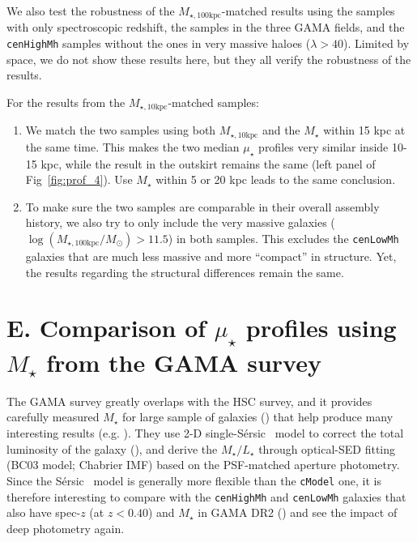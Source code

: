 \documentclass[a4paper,fleqn,usenatbib]{mnras}
\def\ser{{S\'{e}rsic\ }}
\def\rbcg{\texttt{cenHighMh}}
\def\nbcg{\texttt{cenLowMh}}
\def\mstar{{$M_{\star}$}}
\def\minn{{$M_{\star,10\mathrm{kpc}}$}}
\def\mtot{{$M_{\star,100\mathrm{kpc}}$}}
\def\logmtot{{$\log (M_{\star,100\mathrm{kpc}}/M_{\odot})$}}
\def\m2l{{$M_{\star}/L_{\star}$}}
\def\mden{{$\mu_{\star}$}}
\begin{document}
    We also test the robustness of the \mtot{}-matched results using the samples with 
    only spectroscopic redshift, the samples in the three GAMA fields, and the \rbcg{} 
    samples without the ones in very massive haloes ($\lambda > 40$).  
    Limited by space, we do not show these results here, but they all verify the 
    robustness of the results. 
    
    For the results from the \minn{}-matched samples: 
    
    \begin{enumerate}
    
        \item
            We match the two samples using both \minn{} and the \mstar{} within 15 kpc 
            at the same time.  
            This makes the two median \mden{} profiles very similar inside 10-15 
            kpc, while the result in the outskirt remains the same (left panel of 
            Fig~\ref{fig:prof_4}).
            Use \mstar{} within 5 or 20 kpc leads to the same conclusion. 
          
        \item 
            To make sure the two samples are comparable in their overall assembly history,
            we also try to only include the very massive galaxies (\logmtot{}$>11.5$)
            in both samples. 
            This excludes the \nbcg{} galaxies that are much less massive and 
            more ``compact'' in structure. 
            Yet, the results regarding the structural differences remain the same. 
          
    \end{enumerate}


\section{E. Comparison of \mden{} profiles using \mstar{} from the GAMA survey}
    \label{app:gama} 

    The GAMA survey greatly overlaps with the HSC survey, and it provides carefully 
    measured \mstar{} for large sample of galaxies (\citealt{Taylor2011}) that help 
    produce many interesting results (e.g. \citealt{Bauer2013, Ferreras2017}).
    They use 2-D single-\ser{} model to correct the total luminosity of the galaxy 
    (\citealt{Kelvin2012}), and derive the \m2l{} through optical-SED fitting 
    (BC03 model; Chabrier IMF) based on the PSF-matched aperture photometry. 
    Since the \ser{} model is generally more flexible than the \texttt{cModel} one, 
    it is therefore interesting to compare with the \rbcg{} and \nbcg{} galaxies 
    that also have spec-$z$ (at $z < 0.40$) and \mstar{} in GAMA DR2 
    (\citealt{Liske2015}) and see the impact of deep photometry again. 
    
\end{document}
